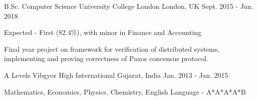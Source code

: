 

\begin{cventries}

  \cventry
    {B.Sc. Computer Science}
    {University College London}
    {London, UK}
    {Sept. 2015 - Jun. 2018}
    {
      \begin{cvitems}
        \item {Expected - First (82.4\%), with minor in Finance and Accounting}
        \item {Final year project on framework for verification of distributed systems, implementing and proving correctness of Paxos concensus protocol.}
      \end{cvitems}
    }

  \cventry
    {A Levels}
    {Vibgyor High International}
    {Gujarat, India}
    {Jan. 2013 - Jan. 2015}
    {
      \begin{cvitems}
        \item {Mathematics, Economics, Physics, Chemistry, English Language - A*A*A*A*B}
      \end{cvitems}
    }
\end{cventries}
